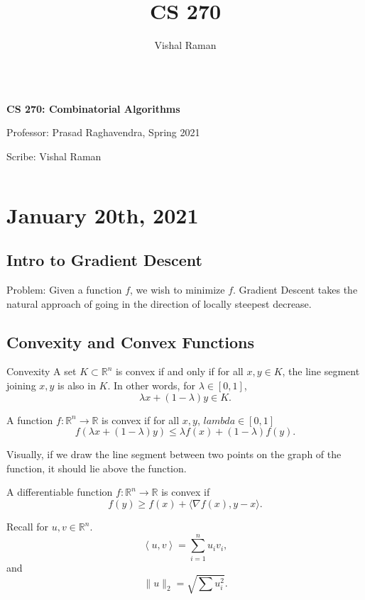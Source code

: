 \documentclass[12pt]{scrartcl}
\newcommand{\R}{\mathbb{R}}
\newcommand{\<}{\langle}
\renewcommand{\>}{\rangle}
\begin{document}
\title{CS 270}
\author{Vishal Raman}
\thispagestyle{empty}
$ $
\vfill
\begin{center}

\centerline{\huge \textbf{CS 270: Combinatorial Algorithms} } 
\centerline{Professor: Prasad Raghavendra, Spring 2021}
\centerline{Scribe: Vishal Raman}
\end{center}
\vfill
$ $
\newpage
\thispagestyle{empty}
\tableofcontents
\newpage
\section{January 20th, 2021}
\subsection{Intro to Gradient Descent}
Problem:  Given a function $f$, we wish to minimize $f$.  Gradient Descent takes the natural approach of going in the direction of locally steepest decrease.
\subsection{Convexity and Convex Functions}
\begin{definition}{Convexity} A set $K \subset \R^n$ is  convex if and only if for all $x, y \in K$, the line segment joining $x, y$ is also in $K$.  In other words, for $\lambda \in [0, 1]$, $$\lambda x + (1 - \lambda )y \in K.$$
\end{definition}

\begin{definition} A function $f: \R^n \to \R$ is convex if for all $x, y$, $lambda \in [0, 1]$
$$f(\lambda x + (1 -\lambda )y) \le \lambda f(x) + (1 - \lambda) f(y).$$
\end{definition}
\begin{remark} Visually, if we draw the line segment between two points on the graph of the function, it should lie above the function.
\end{remark}
\begin{definition} A differentiable function $f: \R^n \to \R$ is convex if 
$$f(y) \ge f(x) + \langle \nabla f(x), y-x \rangle.$$
\end{definition}
Recall for $u, v \in \R^n$.
$$\left <u, v\right > = \sum_{i=1}^n u_i v_i,$$
and 
$$\|u\|_2 = \sqrt{\sum u_i ^2}.$$
\end{document}
